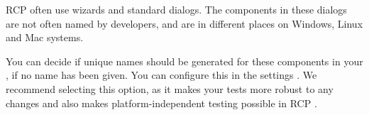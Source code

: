 
RCP \gdauts{} often use wizards and standard dialogs. The components in these dialogs are not often named by developers, and are in different places on Windows, Linux and Mac systems. 

You can decide if unique names should be generated for these components in your \gdaut{}, if no name has been given. You can configure this in the \gdaut{} settings . We recommend selecting this option, as it makes your tests more robust to any changes and also makes platform-independent testing possible in RCP \gdauts{}. 
